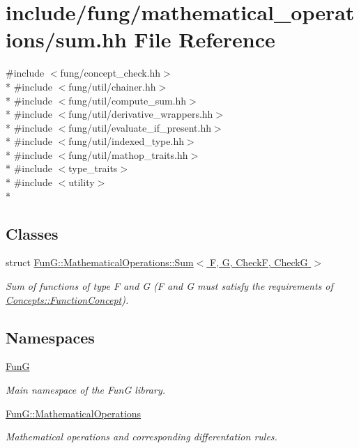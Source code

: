\hypertarget{sum_8hh}{\section{include/fung/mathematical\-\_\-operations/sum.hh File Reference}
\label{sum_8hh}
}
{\ttfamily \#include $<$fung/concept\-\_\-check.\-hh$>$}\\*
{\ttfamily \#include $<$fung/util/chainer.\-hh$>$}\\*
{\ttfamily \#include $<$fung/util/compute\-\_\-sum.\-hh$>$}\\*
{\ttfamily \#include $<$fung/util/derivative\-\_\-wrappers.\-hh$>$}\\*
{\ttfamily \#include $<$fung/util/evaluate\-\_\-if\-\_\-present.\-hh$>$}\\*
{\ttfamily \#include $<$fung/util/indexed\-\_\-type.\-hh$>$}\\*
{\ttfamily \#include $<$fung/util/mathop\-\_\-traits.\-hh$>$}\\*
{\ttfamily \#include $<$type\-\_\-traits$>$}\\*
{\ttfamily \#include $<$utility$>$}\\*
\subsection*{Classes}
\begin{DoxyCompactItemize}
\item 
struct \hyperlink{structFunG_1_1MathematicalOperations_1_1Sum}{Fun\-G\-::\-Mathematical\-Operations\-::\-Sum$<$ F, G, Check\-F, Check\-G $>$}
\begin{DoxyCompactList}\small\item\em Sum of functions of type F and G (F and G must satisfy the requirements of \hyperlink{structFunG_1_1Concepts_1_1FunctionConcept}{Concepts\-::\-Function\-Concept}). \end{DoxyCompactList}\end{DoxyCompactItemize}
\subsection*{Namespaces}
\begin{DoxyCompactItemize}
\item 
\hyperlink{namespaceFunG}{Fun\-G}
\begin{DoxyCompactList}\small\item\em Main namespace of the Fun\-G library. \end{DoxyCompactList}\item 
\hyperlink{namespaceFunG_1_1MathematicalOperations}{Fun\-G\-::\-Mathematical\-Operations}
\begin{DoxyCompactList}\small\item\em Mathematical operations and corresponding differentation rules. \end{DoxyCompactList}\end{DoxyCompactItemize}

